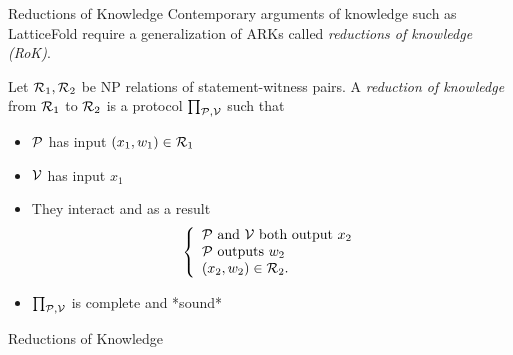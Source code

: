 \begin{frame}{Reductions of Knowledge}
	Contemporary arguments of knowledge such as \textrm{LatticeFold}
	require a generalization of ARKs called \emph{reductions of knowledge
	(RoK)}.
	\begin{definition}
		Let $\mathcal{R}_1, \mathcal{R}_2$ be NP relations of statement-witness
		pairs. A \emph{reduction of knowledge} from $\mathcal{R}_1$ to
		$\mathcal{R}_2$ is a protocol $\prod_{\mathcal{P},\mathcal{V}}$ such that
		\begin{itemize}
			\item $\mathcal{P}$ has input $(x_1,w_1) \in \mathcal{R}_1$
			\item $\mathcal{V}$ has input $x_1$
			\item They interact and as a result
				\[
					\left\{
						\begin{array}{l}
							\mbox{$\mathcal{P}$ and $\mathcal{V}$
							both output $x_2$}\\
							\mbox{$\mathcal{P}$ outputs
							$w_2$}\\
							(x_2, w_2) \in \mathcal{R}_2.
						\end{array}
					\right.
				\]
			\item $\prod_{\mathcal{P},\mathcal{V}}$ is complete and *sound*
		\end{itemize}
	\end{definition}
\end{frame}

\begin{frame}{Reductions of Knowledge}
	\large
\end{frame}

